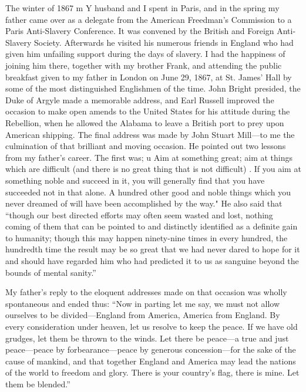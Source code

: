 \documentclass{book}
\begin{document}
The winter of 1867 m Y husband and I spent in Paris, and in the spring my father came over as a delegate from the American Freedman’s Commission to a Paris Anti-Slavery Conference. It was convened by the British and Foreign Anti-Slavery Society. Afterwards he visited his numerous friends in England who had given him unfailing support during the days of slavery. I had the happiness of joining him there, together with my brother Frank, and attending the public breakfast given to my father in London on June 29, 1867, at St. James’ Hall by some of the most distinguished Englishmen of the time. John Bright presided, the Duke of Argyle made a memorable address, and Earl Russell improved the occasion to make open amends to the United States for his attitude during the Rebellion, when he allowed the Alabama to leave a British port to prey upon American shipping. The final address was made by John Stuart Mill—to me the culmination of that brilliant and moving occasion. He pointed out two lessons from my father’s career. The first was; u Aim at something great; aim at things which are difficult (and there is no great thing that is not difficult) . If you aim at something noble and succeed in it, you will generally find that you have succeeded not in that alone. A hundred other good and noble things which you never dreamed of will have been accomplished by the way." He also said that “though our best directed efforts may often seem wasted and lost, nothing coming of them that can be pointed to and distinctly identified as a definite gain to humanity; though this may happen ninety-nine times in every hundred, the hundredth time the result may be so great that we had never dared to hope for it and should have regarded him who had predicted it to us as sanguine beyond the bounds of mental sanity.”

My father’s reply to the eloquent addresses made on that occasion was wholly spontaneous and ended thus: “Now in parting let me say, we must not allow ourselves to be divided—England from America, America from England. By every consideration under heaven, let us resolve to keep the peace. If we have old grudges, let them be thrown to the winds. Let there be peace—a true and just peace—peace by forbearance—peace by generous concession—for the sake of the cause of mankind, and that together England and America may lead the nations of the world to freedom and glory. There is your country’s flag, there is mine. Let them be blended.”
\end{document}
